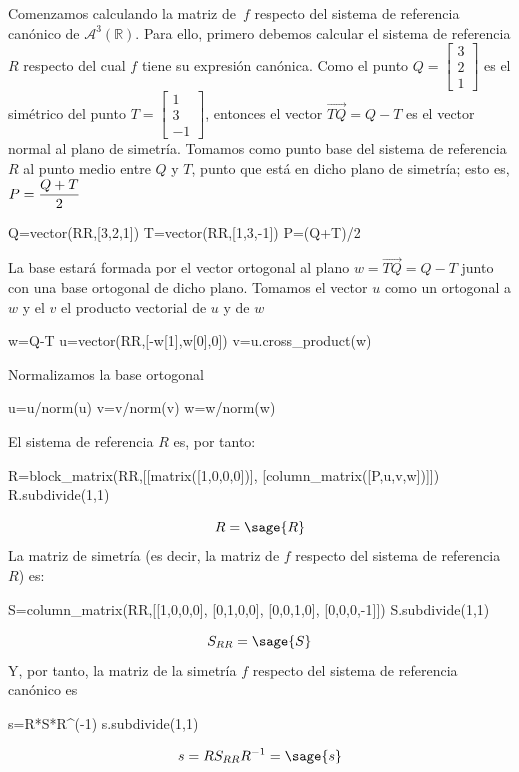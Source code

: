 \documentclass{amsart}
\begin{document}
Comenzamos calculando la matriz de~$f$ respecto del sistema de referencia can\'onico
de $\mathcal{A}^3(\mathbb{R})$. Para ello, primero debemos calcular el sistema de referencia $R$ respecto del cual $f$ tiene su expresión canónica. 
Como el punto $Q = \left[\begin{array}{c} 3\\2\\1 \end{array}\right]$ es el simétrico del punto $T = \left[\begin{array}{c} 1\\3\\-1 \end{array}\right]$, entonces el vector $\vec{TQ}=Q-T$ es el vector normal al plano de simetría. Tomamos como punto base del sistema de referencia $R$ al punto medio entre $Q$ y $T$, punto que está en dicho plano de simetría; esto es, $P = \displaystyle{Q+T \over 2}$

\begin{sageblock}
Q=vector(RR,[3,2,1])
T=vector(RR,[1,3,-1])
P=(Q+T)/2 
\end{sageblock}



La base estará formada por el vector ortogonal al plano $w=\vec{TQ}=Q-T$ junto con una base ortogonal de dicho plano. Tomamos el vector $u$ como un ortogonal a $w$ y el $v$ el producto vectorial de $u$ y de $w$

\begin{sageblock}
w=Q-T
u=vector(RR,[-w[1],w[0],0])
v=u.cross_product(w)
\end{sageblock}
Normalizamos la base ortogonal
\begin{sageblock}
u=u/norm(u)
v=v/norm(v)
w=w/norm(w)
\end{sageblock}
El sistema de referencia $R$ es, por tanto:
\begin{sageblock}
R=block_matrix(RR,[[matrix([1,0,0,0])],
                  [column_matrix([P,u,v,w])]])
R.subdivide(1,1)
\end{sageblock}
$$R=\sage{R}$$
La matriz de simetría (es decir, la matriz de $f$ respecto del sistema de referencia $R$) es:
\begin{sageblock}
S=column_matrix(RR,[[1,0,0,0],
                   [0,1,0,0],
                   [0,0,1,0],
                   [0,0,0,-1]])
S.subdivide(1,1)                   
\end{sageblock}
$$S_{RR}=\sage{S}$$
Y, por tanto,  la matriz de la simetría $f$ respecto del sistema de referencia canónico es
\begin{sageblock}
s=R*S*R^(-1) 
s.subdivide(1,1)
\end{sageblock}
\[s=RS_{RR}R^{-1}=\sage{s}\]
\end{document}
